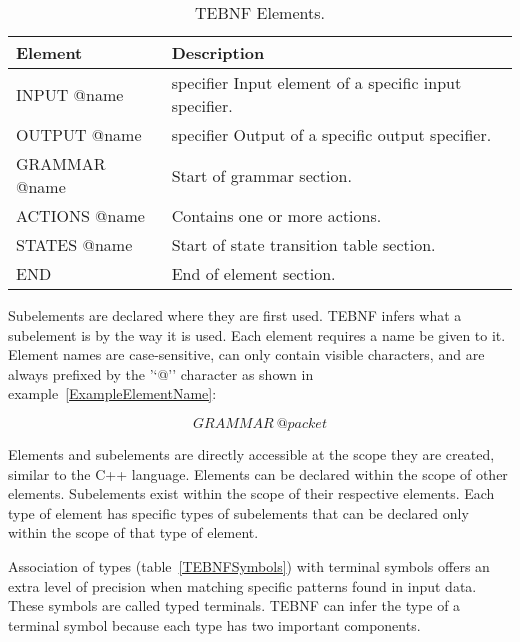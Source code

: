 \begin{table}[h]
\begin{center}
\caption{TEBNF Elements.}
\label{TEBNFElements}
\begin{tabular}{|l|l|} \hline
\textbf{Element} & \textbf{Description} \\ \hline \hline
INPUT @name & specifier	Input element of a specific input specifier. \\ \hline
OUTPUT @name & specifier	Output of a specific output specifier. \\ \hline
GRAMMAR @name & Start of grammar section. \\ \hline
ACTIONS @name & Contains one or more actions. \\ \hline
STATES @name & Start of state transition table section. \\ \hline
END	& End of element section. \\ \hline
\end{tabular}
\end{center}
\end{table}

\indent
Subelements are declared where they are first used.  TEBNF infers what a subelement is by the way it is used.  Each element requires a name be given to it.  Element names are case-sensitive, can only contain visible characters, and are always prefixed by the '‘@'’ character as shown in example~\ref{ExampleElementName}:

\begin{equation}
GRAMMAR \ @packet
\label{ExampleElementName}
\end{equation}

\label{sec:TEBNFScopingRules}
Elements and subelements are directly accessible at the scope they are created, similar to the C++ language.  Elements can be declared within the scope of other elements.  Subelements exist within the scope of their respective elements.  Each type of element has specific types of subelements that can be declared only within the scope of that type of element.

\label{sec:TEBNFTypes}
Association of types (table~\ref{TEBNFSymbols}) with terminal symbols offers an extra level of precision when matching specific patterns found in input data.  These symbols are called typed terminals.  TEBNF can infer the type of a terminal symbol because each type has two important components.

